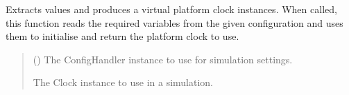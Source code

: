 \documentclass[letterpaper,10pt,english]{sphinxmanual}
\begin{document}

\begin{fulllineitems}
\label{\detokenize{modules/input/config:qnav.input.config.get_platform_clock}}
\pysigstartsignatures
{}
\pysigstopsignatures
\sphinxAtStartPar
Extracts values and produces a virtual platform clock instances.
When called, this function reads the required variables from the
given configuration and uses them to initialise and return the
platform clock to use.
\begin{quote}\begin{description}
\sphinxAtStartPar
{} ({\hyperref[\detokenize{modules/input/config_handler:qnav.input.config_handler.ConfigHandler}]{}}) \textendash{} The ConfigHandler instance to use for simulation settings.

\sphinxAtStartPar
The Clock instance to use in a simulation.

\sphinxAtStartPar
{\hyperref[\detokenize{modules/measurement/clock:qnav.measurement.clock.Clock}]{}}

\end{description}\end{quote}

\end{fulllineitems}

\end{document}
